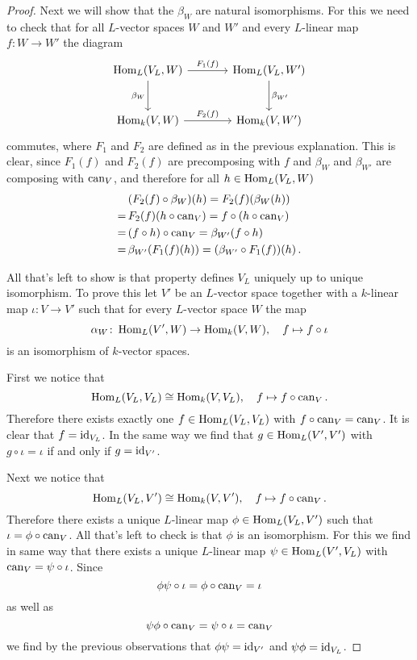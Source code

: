\begin{proof}
  Next we will show that the $\beta_W$ are natural isomorphisms.
  For this we need to check that for all $L$-vector spaces $W$ and $W'$ and every $L$-linear map \mbox{$f \colon W \to W'$} the diagram
  \[
    \begin{tikzcd}[sep = large]
        \Hom_L(V_L, W)
        \arrow{r}{F_1(f)}
        \arrow[swap]{d}{\beta_W}
      & \Hom_L(V_L, W')
        \arrow{d}{\beta_{W'}}
      \\
        \Hom_k(V,W)
        \arrow{r}{F_2(f)}
      & \Hom_k(V,W')
    \end{tikzcd}
  \]
  commutes, where $F_1$ and $F_2$ are defined as in the previous explanation.
  This is clear, since $F_1(f)$ and $F_2(f)$ are precomposing with $f$ and $\beta_W$ and $\beta_{W'}$ are composing with $\operatorname{can}_V$, and therefore for all $h \in \operatorname{Hom}_L(V_L, W)$
  \begin{align*}
     &\,  (F_2(f) \circ \beta_W)(h)
    =     F_2(f)(\beta_W(h)) \\
    =&\,  F_2(f)(h \circ \operatorname{can}_V)
    =     f \circ (h \circ \operatorname{can}_V) \\
    =&\,  (f \circ h) \circ \operatorname{can}_V
    =     \beta_{W'}(f \circ h) \\
    =&\,  \beta_{W'}(F_1(f)(h))
    =     (\beta_{W'} \circ F_1(f))(h) \,.
  \end{align*}
  
  All that’s left to show is that property defines $V_L$ uniquely up to unique isomorphism.
  To prove this let $V'$ be an $L$-vector space together with a $k$-linear map $\iota \colon V \to V'$ such that for every $L$-vector space $W$ the map
  \[
            \alpha_W
    \colon  \operatorname{Hom}_L(V', W)
    \to     \operatorname{Hom}_k(V, W),
    \quad   f
    \mapsto f \circ \iota
  \]
  is an isomorphism of $k$-vector spaces.
  
  First we notice that
  \[
            \operatorname{Hom}_L(V_L, V_L)
    \cong   \operatorname{Hom}_k(V, V_L),
    \quad   f
    \mapsto f \circ \operatorname{can}_V.
  \]
  Therefore there exists exactly one $f \in \operatorname{Hom}_L(V_L, V_L)$ with $f \circ \operatorname{can}_V = \operatorname{can}_V$.
  It is clear that $f = \operatorname{id}_{V_L}$.
  In the same way we find that $g \in \operatorname{Hom}_L(V', V')$ with $g \circ \iota = \iota$ if and only if $g = \operatorname{id}_{V'}$.
  
  Next we notice that
  \[
            \operatorname{Hom}_L(V_L, V')
    \cong   \operatorname{Hom}_k(V, V'),
    \quad   f
    \mapsto f \circ \operatorname{can}_V.
  \]
  Therefore there exists a unique $L$-linear map $\phi \in \operatorname{Hom}_L(V_L, V')$ such that \mbox{$\iota = \phi \circ \operatorname{can}_V$}.
  All that’s left to check is that $\phi$ is an isomorphism.
  For this we find in same way that there exists a unique $L$-linear map $\psi \in \operatorname{Hom}_L(V', V_L)$ with $\operatorname{can}_V = \psi \circ \iota$.
  Since
  \[
      \phi \psi \circ \iota
    = \phi \circ \operatorname{can}_V
    = \iota
  \]
  as well as
  \[
      \psi \phi \circ \operatorname{can}_V
    = \psi \circ \iota
    = \operatorname{can}_V
  \]
  we find by the previous observations that $\phi \psi = \operatorname{id}_{V'}$ and $\psi \phi = \operatorname{id}_{V_L}$.
\end{proof}


